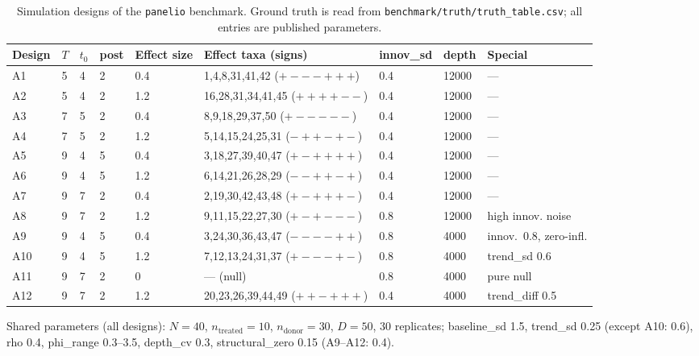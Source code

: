 \documentclass[11pt]{article}
\begin{document}
\begin{table}[H]
\centering
\caption{Simulation designs of the \texttt{panelio} benchmark. Ground truth is read from
\texttt{benchmark/truth/truth\_table.csv}; all entries are published parameters.}
\label{tab:design}
\begin{threeparttable}
\footnotesize
\begin{tabular}{lllllllll}
\toprule
Design & $T$ & $t_0$ & post & Effect size & Effect taxa (signs) & innov\_sd & depth & Special \\
\midrule
A1 & 5 & 4 & 2 & 0.4 & 1,4,8,31,41,42 ($+---+++$) & 0.4 & 12000 & --- \\
A2 & 5 & 4 & 2 & 1.2 & 16,28,31,34,41,45 ($++++--$) & 0.4 & 12000 & --- \\
A3 & 7 & 5 & 2 & 0.4 & 8,9,18,29,37,50 ($+-----$) & 0.4 & 12000 & --- \\
A4 & 7 & 5 & 2 & 1.2 & 5,14,15,24,25,31 ($-++-+-$) & 0.4 & 12000 & --- \\
A5 & 9 & 4 & 5 & 0.4 & 3,18,27,39,40,47 ($+-++++$) & 0.4 & 12000 & --- \\
A6 & 9 & 4 & 5 & 1.2 & 6,14,21,26,28,29 ($--++-+$) & 0.4 & 12000 & --- \\
A7 & 9 & 7 & 2 & 0.4 & 2,19,30,42,43,48 ($+-+++-$) & 0.4 & 12000 & --- \\
A8 & 9 & 7 & 2 & 1.2 & 9,11,15,22,27,30 ($+-+---$) & 0.8 & 12000 & high innov. noise \\
A9 & 9 & 4 & 5 & 0.4 & 3,24,30,36,43,47 ($----++$) & 0.8 & 4000 & innov.\ 0.8, zero-infl. \\
A10 & 9 & 4 & 5 & 1.2 & 7,12,13,24,31,37 ($+---+-$) & 0.8 & 4000 & trend\_sd 0.6 \\
A11 & 9 & 7 & 2 & 0 & --- (null) & 0.8 & 4000 & pure null \\
A12 & 9 & 7 & 2 & 1.2 & 20,23,26,39,44,49 ($++-+++$) & 0.4 & 4000 & trend\_diff 0.5 \\
\bottomrule
\end{tabular}
\begin{tablenotes}\small
\item Shared parameters (all designs): $N{=}40$, $n_{\mathrm{treated}}{=}10$, $n_{\mathrm{donor}}{=}30$,
$D{=}50$, 30 replicates; baseline\_sd 1.5, trend\_sd 0.25 (except A10: 0.6), rho 0.4,
phi\_range 0.3--3.5, depth\_cv 0.3, structural\_zero 0.15 (A9--A12: 0.4).
\end{tablenotes}
\end{threeparttable}
\end{table}
\end{document}
